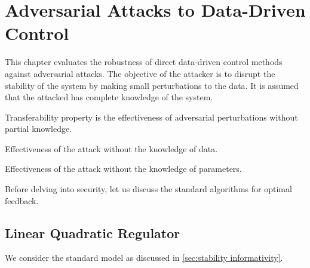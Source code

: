 \chapter{Adversarial Attacks to Data-Driven Control}\doublespacing %
\label{chap:attacks} %
This chapter evaluates the robustness of direct data-driven control methods against adversarial attacks. %
The objective of the attacker is to disrupt the stability of the system by making small perturbations to the data.
It is assumed that the attacked has complete knowledge of the system.
\begin{definition}
Transferability property is the effectiveness of adversarial perturbations without partial knowledge.
\end{definition}
\begin{definition}
Effectiveness of the attack without the knowledge of data.
\end{definition}
\begin{definition}
Effectiveness of the attack without the knowledge of parameters.
\end{definition}
Before delving into security, let us discuss the standard algorithms for optimal feedback.
\section{Linear Quadratic Regulator}%
\label{subsec:data-driven}
We consider the standard model as discussed in \ref{sec:stability informativity}.

